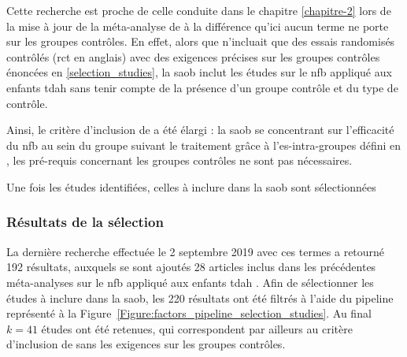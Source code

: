 Cette recherche est proche de celle conduite dans le chapitre \ref{chapitre-2} lors de la mise à jour de la méta-analyse de \citet{Cortese2016} à la différence
qu'ici aucun terme ne porte sur les groupes contrôles. En effet, alors que \citet{Cortese2016} n'incluait que des essais randomisés contrôlés (\gls{rct} en anglais) 
avec des exigences précises sur les groupes contrôles énoncées en \ref{selection_studies}, la \gls{saob} inclut les études sur le \gls{nfb} appliqué aux enfants 
\gls{tdah} sans tenir compte de la présence d'un groupe contrôle et du type de contrôle. 

Ainsi, le critère d'inclusion de \citet{Cortese2016} a été élargi : la \gls{saob} se concentrant sur l'efficacité du \gls{nfb} au sein du 
groupe suivant le traitement grâce à l'\gls{es}-intra-groupes défini en \label{es_within}, les pré-requis concernant les groupes contrôles 
ne sont pas nécessaires.

Une fois les études identifiées, celles à inclure dans la \gls{saob} sont sélectionnées

\subsubsection{Résultats de la sélection}

La dernière recherche effectuée le 2 septembre 2019 avec ces termes a retourné 192 résultats, auxquels se sont ajoutés 28 articles inclus dans les précédentes 
méta-analyses sur le \gls{nfb} appliqué aux enfants \gls{tdah} \citep{Arns2009, Sonuga-Barke2013, Micoulaud2014, 
Cortese2016, Catala2017, VanDoren2019, Riesco2019, Bussalb2019clinical}. 
Afin de sélectionner les études à inclure dans la \gls{saob}, les 220 résultats ont été filtrés à l'aide du pipeline représenté à la 
Figure~\ref{Figure:factors_pipeline_selection_studies}. Au final $k = 41$ études ont été retenues, qui correspondent par ailleurs au critère d'inclusion de
\citet{Cortese2016} sans les exigences sur les groupes contrôles. 

